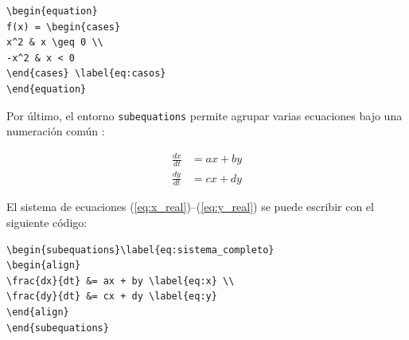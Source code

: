 \begin{verbatim}
\begin{equation}
f(x) = \begin{cases}
x^2 & x \geq 0 \\
-x^2 & x < 0
\end{cases} \label{eq:casos}
\end{equation}
\end{verbatim}

Por último, el entorno \texttt{subequations} permite agrupar varias ecuaciones bajo una numeración común \cite{amsmath_manual}:

\begin{subequations}\label{eq:sistema_completo_real}
\begin{align}
\frac{dx}{dt} &= ax + by \label{eq:x_real} \\
\frac{dy}{dt} &= cx + dy \label{eq:y_real}
\end{align}
\end{subequations}

El sistema de ecuaciones (\ref{eq:x_real})--(\ref{eq:y_real}) se puede escribir con el siguiente código:

\begin{verbatim}
\begin{subequations}\label{eq:sistema_completo}
\begin{align}
\frac{dx}{dt} &= ax + by \label{eq:x} \\
\frac{dy}{dt} &= cx + dy \label{eq:y}
\end{align}
\end{subequations}
\end{verbatim}



